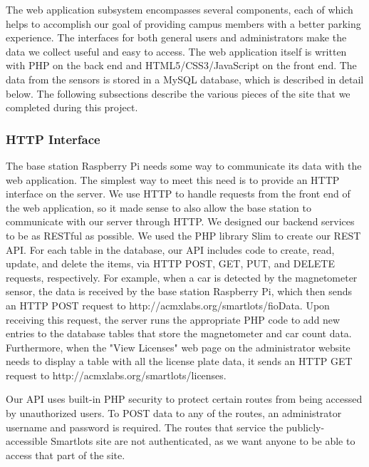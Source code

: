 \documentclass[11pt, oneside, fullpage, doublespace]{article}
\begin{document}
The web application subsystem encompasses several components, each of which helps to accomplish our goal of providing campus members with a better parking experience. The interfaces for both general users and administrators make the data we collect useful and easy to access. The web application itself is written with PHP on the back end and HTML5/CSS3/JavaScript on the front end. The data from the sensors is stored in a MySQL database, which is described in detail below. The following subsections describe the various pieces of the site that we completed during this project.

\subsubsection{HTTP Interface}
The base station Raspberry Pi needs some way to communicate its data with the web application. The simplest way to meet this need is to provide an HTTP interface on the server. We use HTTP to handle requests from the front end of the web application, so it made sense to also allow the base station to communicate with our server through HTTP. We designed our backend services to be as RESTful \cite{rest} as possible. We used the PHP library Slim \cite{Slim} to create our REST API. For each table in the database, our API includes code to create, read, update, and delete the items, via HTTP POST, GET, PUT, and DELETE requests, respectively. For example, when a car is detected by the magnetometer sensor, the data is received by the base station Raspberry Pi, which then sends an HTTP POST request to http://acmxlabs.org/smartlots/fioData. Upon receiving this request, the server runs the appropriate PHP code to add new entries to the database tables that store the magnetometer and car count data. Furthermore, when the "View Licenses" web page on the administrator website needs to display a table with all the license plate data, it sends an HTTP GET request to http://acmxlabs.org/smartlots/licenses.

Our API uses built-in PHP security to protect certain routes from being accessed by unauthorized users. To POST data to any of the routes, an administrator username and password is required. The routes that service the publicly-accessible Smartlots site are not authenticated, as we want anyone to be able to access that part of the site.
\end{document}
